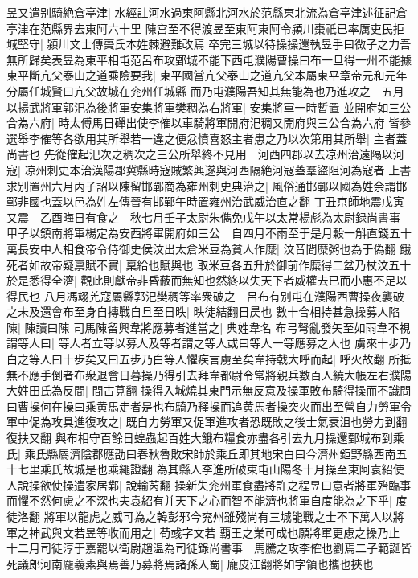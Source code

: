 昱又遣别騎絶倉亭津|{
	水經註河水過東阿縣北河水於范縣東北流為倉亭津述征記倉亭津在范縣界去東阿六十里}
陳宫至不得渡昱至東阿東阿令潁川棗祇已率厲吏民拒城堅守|{
	潁川文士傳棗氏本姓棘避難改焉}
卒完三城以待操操還執昱手曰微子之力吾無所歸矣表昱為東平相屯范呂布攻鄄城不能下西屯濮陽曹操曰布一旦得一州不能據東平斷亢父泰山之道乘險要我|{
	東平國當亢父泰山之道亢父本屬東平章帝元和元年分屬任城賢曰亢父故城在兖州任城縣}
而乃屯濮陽吾知其無能為也乃進攻之　五月以揚武將軍郭汜為後將軍安集將軍樊稠為右將軍|{
	安集將軍一時暫置}
並開府如三公合為六府|{
	時太傅馬日磾出使李傕以車騎將軍開府汜稠又開府與三公合為六府}
皆參選舉李傕等各欲用其所舉若一違之便忿憤喜怒主者患之乃以次第用其所舉|{
	主者蓋尚書也}
先從傕起汜次之稠次之三公所舉終不見用　河西四郡以去凉州治遠隔以河寇|{
	凉州刺史本治漢陽郡冀縣時寇賊繁興遂與河西隔絶河寇蓋羣盜阻河為寇者}
上書求别置州六月丙子詔以陳留邯鄲商為雍州刺史典治之|{
	風俗通邯鄲以國為姓余謂邯鄲非國也蓋以邑為姓左傳晉有邯鄲午時置雍州治武威治直之翻}
丁丑京師地震戊寅又震　乙酉晦日有食之　秋七月壬子太尉朱儁免戊午以太常楊彪為太尉録尚書事　甲子以鎮南將軍楊定為安西將軍開府如三公　自四月不雨至于是月糓一斛直錢五十萬長安中人相食帝令侍御史侯汶出太倉米豆為貧人作糜|{
	汶音聞糜粥也為于偽翻}
餓死者如故帝疑禀賦不實|{
	稟給也賦與也}
取米豆各五升於御前作糜得二盆乃杖汶五十於是悉得全濟|{
	觀此則獻帝非昏蔽而無知也然終以失天下者威權去已而小惠不足以得民也}
八月馮翊羌寇屬縣郭汜樊稠等率衆破之　呂布有别屯在濮陽西曹操夜襲破之未及還會布至身自摶戰自旦至日昳|{
	昳徒結翻日昃也}
數十合相持甚急操募人陷陳|{
	陳讀曰陳}
司馬陳留興韋將應募者進當之|{
	典姓韋名}
布弓弩亂發矢至如雨韋不視謂等人曰|{
	等人者立等以募人及等者謂之等人或曰等人一等應募之人也}
虜來十步乃白之等人曰十步矣又曰五步乃白等人懼疾言虜至矣韋持戟大呼而起|{
	呼火故翻}
所抵無不應手倒者布衆退會日暮操乃得引去拜韋都尉令常將親兵數百人繞大帳左右濮陽大姓田氏為反間|{
	間古莧翻}
操得入城燒其東門示無反意及操軍敗布騎得操而不識問曰曹操何在操曰乘黄馬走者是也布騎乃釋操而追黄馬者操突火而出至營自力勞軍令軍中促為攻具進復攻之|{
	既自力勞軍又促軍進攻者恐既敗之後士氣衰沮也勞力到翻復扶又翻}
與布相守百餘日蝗蟲起百姓大餓布糧食亦盡各引去九月操還鄄城布到乘氏|{
	乘氏縣屬濟陰郡應劭曰春秋魯敗宋師於乘丘即其地宋白曰今濟州鉅野縣西南五十七里乘氏故城是也乘繩證翻}
為其縣人李進所破東屯山陽冬十月操至東阿袁紹使人說操欲使操遣家居鄴|{
	說輸芮翻}
操新失兖州軍食盡將許之程昱曰意者將軍殆臨事而懼不然何慮之不深也夫袁紹有并天下之心而智不能濟也將軍自度能為之下乎|{
	度徒洛翻}
將軍以龍虎之威可為之韓彭邪今兖州雖殘尚有三城能戰之士不下萬人以將軍之神武與文若昱等收而用之|{
	荀彧字文若}
覇王之業可成也願將軍更慮之操乃止　十二月司徒淳于嘉罷以衛尉趙温為司徒錄尚書事　馬騰之攻李傕也劉焉二子範誕皆死議郎河南龎羲素與焉善乃募將焉諸孫入蜀|{
	龐皮江翻將如字領也攜也挾也}
